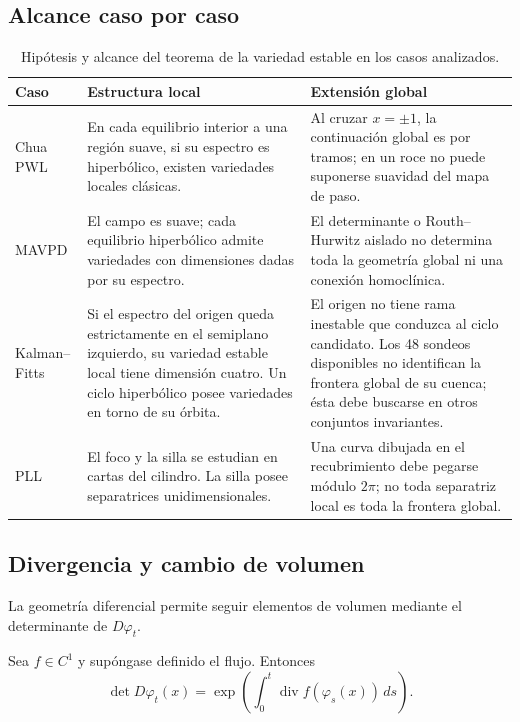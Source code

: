 \subsection{Alcance caso por caso}

\begin{table}[H]
\centering
\caption{Hipótesis y alcance del teorema de la variedad estable en los casos analizados.}
\label{geo:tab:stable-manifold-scope}
\small
\begin{tabularx}{\textwidth}{@{}L{0.17\textwidth}YY@{}}
\toprule
Caso & Estructura local & Extensión global \\
\midrule
Chua PWL & En cada equilibrio interior a una región suave, si su espectro es
hiperbólico, existen variedades locales clásicas. & Al cruzar \(x=\pm1\), la
continuación global es por tramos; en un roce no puede suponerse suavidad del
mapa de paso. \\
MAVPD & El campo es suave; cada equilibrio hiperbólico admite variedades con
dimensiones dadas por su espectro. & El determinante o Routh--Hurwitz aislado
no determina toda la geometría global ni una conexión homoclínica. \\
Kalman--Fitts & Si el espectro del origen queda estrictamente en el
semiplano izquierdo, su variedad estable local tiene dimensión cuatro. Un
ciclo hiperbólico posee variedades en torno de su órbita. & El
origen no tiene rama inestable que conduzca al ciclo candidato. Los 48 sondeos
disponibles no identifican la frontera global de su cuenca; ésta debe buscarse
en otros conjuntos invariantes. \\
PLL & El foco y la silla se estudian en cartas del cilindro. La silla posee
separatrices unidimensionales. & Una curva dibujada en el recubrimiento debe
pegarse módulo \(2\pi\); no toda separatriz local es toda la frontera global.
\\
\bottomrule
\end{tabularx}
\end{table}

\subsection{Divergencia y cambio de volumen}

La geometría diferencial permite seguir elementos de volumen mediante el
determinante de \(D\varphi_t\).

\begin{proposition}
Sea \(f\in C^1\) y supóngase definido el flujo. Entonces
\begin{equation}
 \det D\varphi_t(x)=
 \exp\!\left(
   \int_0^t\operatorname{div}f(\varphi_s(x))\,ds
 \right).
 \label{geo:eq:liouville-volume}
\end{equation}
\end{proposition}


